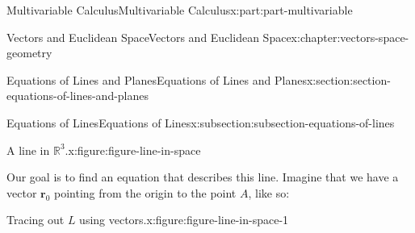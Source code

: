 \documentclass[twoside,10pt,]{book}
\numberwithin{equation}{part}
\begin{document}
\begin{partptx}{Multivariable Calculus}{}{Multivariable Calculus}{}{}{x:part:part-multivariable}
\begin{chapterptx}{Vectors and Euclidean Space}{}{Vectors and Euclidean Space}{}{}{x:chapter:vectors-space-geometry}
\begin{sectionptx}{Equations of Lines and Planes}{}{Equations of Lines and Planes}{}{}{x:section:section-equations-of-lines-and-planes}
\begin{subsectionptx}{Equations of Lines}{}{Equations of Lines}{}{}{x:subsection:subsection-equations-of-lines}
\begin{figureptx}{A line in \(\mathbb{R}^{3}\).}{x:figure:figure-line-in-space}{}
\begin{image}{0.05}{0.9}{0.05}
{
}%
\end{image}%
\tcblower
\end{figureptx}%
Our goal is to find an equation that describes this line. Imagine that we have a vector \(\mathbf{r}_{0}\) pointing from the origin to the point \(A\), like so:%
\begin{figureptx}{Tracing out \(L\) using vectors.}{x:figure:figure-line-in-space-1}{}%
\begin{image}{0.05}{0.9}{0.05}%
\end{image}
\end{figureptx}
\end{subsectionptx}
\end{sectionptx}
\end{chapterptx}
\end{partptx}
\end{document}
